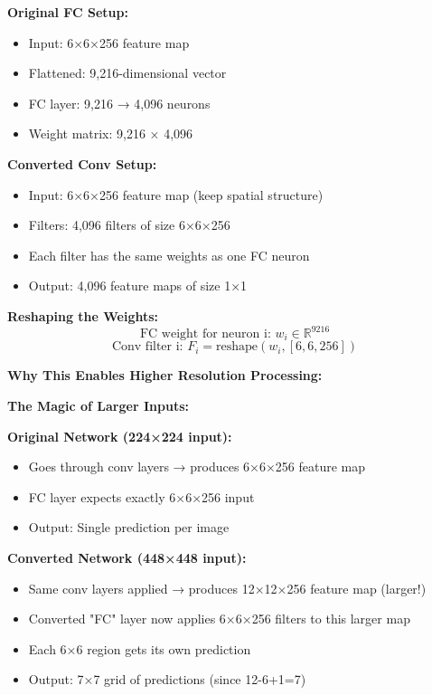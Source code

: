 \documentclass[12pt]{article}
\newcommand{\explanation}[1]{{\color{explanationcolor}#1}}
\begin{document}
\begin{enumerate}[(a)]
{{    \textbf{Original FC Setup:}
    \begin{itemize}
        \item Input: 6×6×256 feature map
        \item Flattened: 9,216-dimensional vector
        \item FC layer: 9,216 → 4,096 neurons
        \item Weight matrix: 9,216 × 4,096
    \end{itemize}
    
    \textbf{Converted Conv Setup:}
    \begin{itemize}
        \item Input: 6×6×256 feature map (keep spatial structure)
        \item Filters: 4,096 filters of size 6×6×256
        \item Each filter has the same weights as one FC neuron
        \item Output: 4,096 feature maps of size 1×1
    \end{itemize}
    
    \textbf{Reshaping the Weights:}
    \[
    \text{FC weight for neuron i: } w_i \in \mathbb{R}^{9216}
    \]
    \[
    \text{Conv filter i: } F_i = \text{reshape}(w_i, [6, 6, 256])
    \]
    }
    
    \textbf{Why This Enables Higher Resolution Processing:}
    
    \explanation{
    \textbf{The Magic of Larger Inputs:}
    
    \textbf{Original Network (224×224 input):}
    \begin{itemize}
        \item Goes through conv layers → produces 6×6×256 feature map
        \item FC layer expects exactly 6×6×256 input
        \item Output: Single prediction per image
    \end{itemize}
    
    \textbf{Converted Network (448×448 input):}
    \begin{itemize}
        \item Same conv layers applied → produces 12×12×256 feature map (larger!)
        \item Converted "FC" layer now applies 6×6×256 filters to this larger map
        \item Each 6×6 region gets its own prediction
        \item Output: 7×7 grid of predictions (since 12-6+1=7)
    \end{itemize}
    
}}
\end{enumerate}
\end{document}
